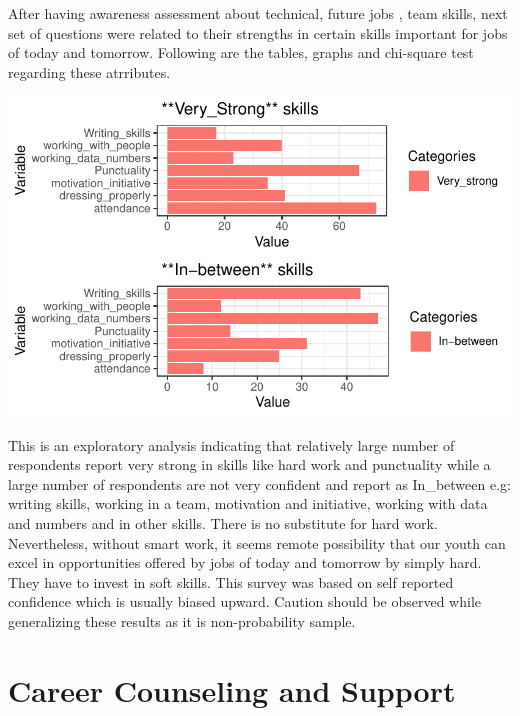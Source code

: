 \documentclass[
  12pt]{article}
\begin{document}
After having awareness assessment about technical, future jobs , team
skills, next set of questions were related to their strengths in certain
skills important for jobs of today and tomorrow. Following are the
tables, graphs and chi-square test regarding these atrributes.

\includegraphics{Journal_article_files/figure-pdf/unnamed-chunk-11-1.pdf}

This is an exploratory analysis indicating that relatively large number
of respondents report very strong in skills like hard work and
punctuality while a large number of respondents are not very confident
and report as In\_between e.g: writing skills, working in a team,
motivation and initiative, working with data and numbers and in other
skills. There is no substitute for hard work. Nevertheless, without
smart work, it seems remote possibility that our youth can excel in
opportunities offered by jobs of today and tomorrow by simply hard. They
have to invest in soft skills. This survey was based on self reported
confidence which is usually biased upward. Caution should be observed
while generalizing these results as it is non-probability sample.

\hypertarget{career-counseling-and-support}{%
\section{Career Counseling and
Support}\label{career-counseling-and-support}}
\end{document}
